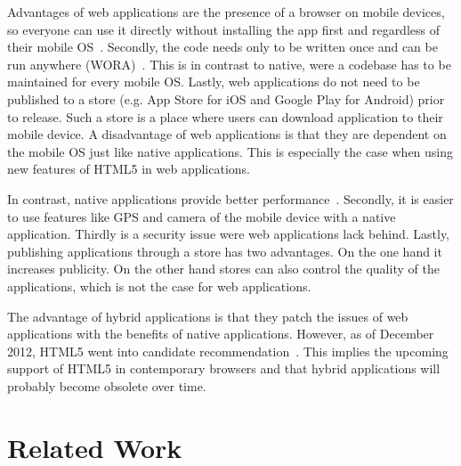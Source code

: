 \documentclass[a4paper]{artikel3}
\begin{document}
Advantages of web applications are the presence of a browser on mobile devices, so everyone can use it directly without installing the app first and regardless of their mobile OS~\cite{Accenture2012}.
Secondly, the code needs only to be written once and can be run anywhere (WORA)~\cite{Hales2012}.
This is in contrast to native, were a codebase has to be maintained for every mobile OS.
Lastly, web applications do not need to be published to a store (e.g. App Store for iOS and Google Play for Android) prior to release.
Such a store is a place where users can download application to their mobile device.
A disadvantage of web applications is that they are dependent on the mobile OS just like native applications.
This is especially the case when using new features of HTML5 in web applications.

In contrast, native applications provide better performance~\cite{Accenture2012}.
Secondly, it is easier to use features like GPS and camera of the mobile device with a native application.
Thirdly is a security issue were web applications lack behind.
Lastly, publishing applications through a store has two advantages.
On the one hand it increases publicity.
On the other hand stores can also control the quality of the applications, which is not the case for web applications.

The advantage of hybrid applications is that they patch the issues of web applications with the benefits of native applications.
However, as of December 2012, HTML5 went into candidate recommendation~\cite{Jacobs2012}.
This implies the upcoming support of HTML5 in contemporary browsers and that hybrid applications will probably become obsolete over time.


\section{Related Work} %
\label{sec:related-work}

\end{document}
